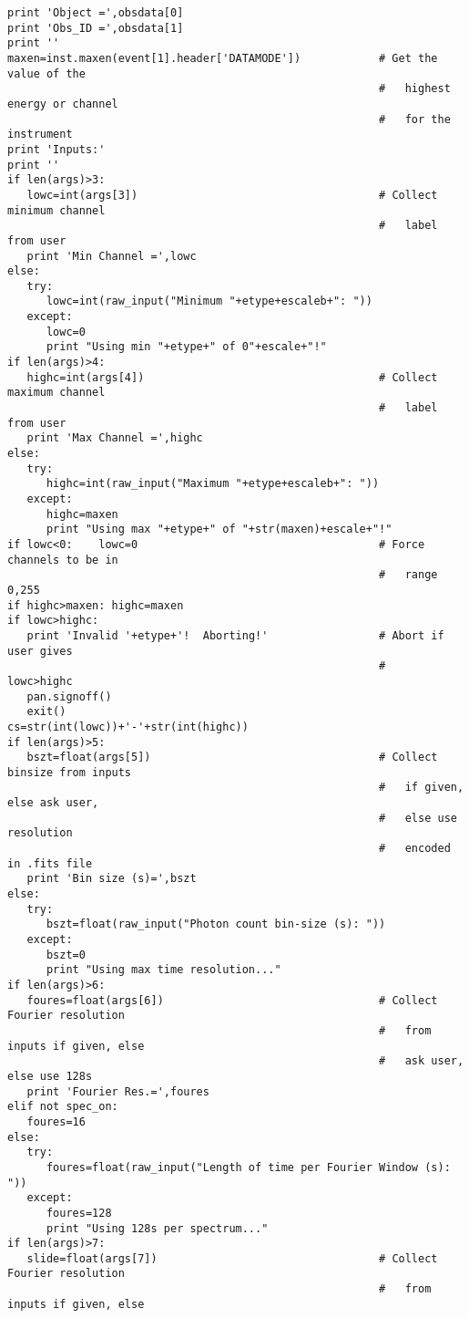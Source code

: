 \begin{verbatim}
print 'Object =',obsdata[0]
print 'Obs_ID =',obsdata[1]
print ''
maxen=inst.maxen(event[1].header['DATAMODE'])            # Get the value of the
                                                         #   highest energy or channel
                                                         #   for the instrument
print 'Inputs:'
print ''
if len(args)>3:
   lowc=int(args[3])                                     # Collect minimum channel
                                                         #   label from user
   print 'Min Channel =',lowc
else:
   try:
      lowc=int(raw_input("Minimum "+etype+escaleb+": "))
   except:
      lowc=0
      print "Using min "+etype+" of 0"+escale+"!"
if len(args)>4:
   highc=int(args[4])                                    # Collect maximum channel
                                                         #   label from user
   print 'Max Channel =',highc
else:
   try:
      highc=int(raw_input("Maximum "+etype+escaleb+": "))
   except:
      highc=maxen
      print "Using max "+etype+" of "+str(maxen)+escale+"!"
if lowc<0:    lowc=0                                     # Force channels to be in
                                                         #   range 0,255
if highc>maxen: highc=maxen
if lowc>highc:
   print 'Invalid '+etype+'!  Aborting!'                 # Abort if user gives
                                                         #   lowc>highc
   pan.signoff()
   exit()
cs=str(int(lowc))+'-'+str(int(highc))
if len(args)>5:
   bszt=float(args[5])                                   # Collect binsize from inputs
                                                         #   if given, else ask user,
                                                         #   else use resolution
                                                         #   encoded in .fits file
   print 'Bin size (s)=',bszt
else:
   try:
      bszt=float(raw_input("Photon count bin-size (s): "))
   except:
      bszt=0
      print "Using max time resolution..."
if len(args)>6:
   foures=float(args[6])                                 # Collect Fourier resolution
                                                         #   from inputs if given, else
                                                         #   ask user, else use 128s
   print 'Fourier Res.=',foures
elif not spec_on:
   foures=16
else:
   try:
      foures=float(raw_input("Length of time per Fourier Window (s): "))
   except:
      foures=128
      print "Using 128s per spectrum..."
if len(args)>7:
   slide=float(args[7])                                  # Collect Fourier resolution
                                                         #   from inputs if given, else

\end{verbatim}
